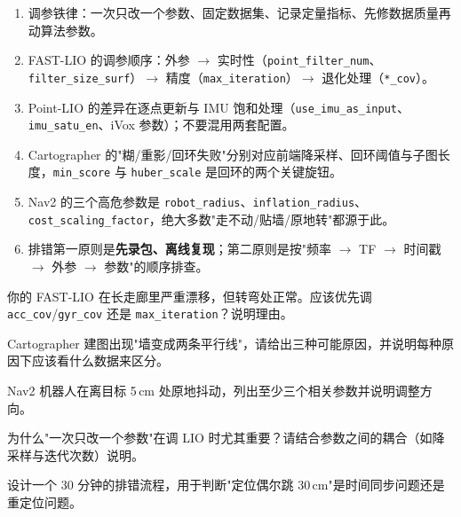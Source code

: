 \begin{summary}

\begin{enumerate}
  \item 调参铁律：一次只改一个参数、固定数据集、记录定量指标、先修数据质量再动算法参数。
  \item FAST-LIO 的调参顺序：外参 $\to$ 实时性（\lstinline{point_filter_num}、\lstinline{filter_size_surf}）$\to$ 精度（\lstinline{max_iteration}）$\to$ 退化处理（\lstinline{*_cov}）。
  \item Point-LIO 的差异在逐点更新与 IMU 饱和处理（\lstinline{use_imu_as_input}、\lstinline{imu_satu_en}、iVox 参数）；不要混用两套配置。
  \item Cartographer 的"糊/重影/回环失败"分别对应前端降采样、回环阈值与子图长度，\lstinline{min_score} 与 \lstinline{huber_scale} 是回环的两个关键旋钮。
  \item Nav2 的三个高危参数是 \lstinline{robot_radius}、\lstinline{inflation_radius}、\lstinline{cost_scaling_factor}，绝大多数"走不动/贴墙/原地转"都源于此。
  \item 排错第一原则是\textbf{先录包、离线复现}；第二原则是按"频率 $\to$ TF $\to$ 时间戳 $\to$ 外参 $\to$ 参数"的顺序排查。
\end{enumerate}


\end{summary}

\begin{problemset}

  \item 你的 FAST-LIO 在长走廊里严重漂移，但转弯处正常。应该优先调 \lstinline{acc_cov}/\lstinline{gyr_cov} 还是 \lstinline{max_iteration}？说明理由。
  \item Cartographer 建图出现"墙变成两条平行线"，请给出三种可能原因，并说明每种原因下应该看什么数据来区分。
  \item Nav2 机器人在离目标 5\,cm 处原地抖动，列出至少三个相关参数并说明调整方向。
  \item 为什么"一次只改一个参数"在调 LIO 时尤其重要？请结合参数之间的耦合（如降采样与迭代次数）说明。
  \item 设计一个 30 分钟的排错流程，用于判断"定位偶尔跳 30\,cm"是时间同步问题还是重定位问题。
\end{problemset}

